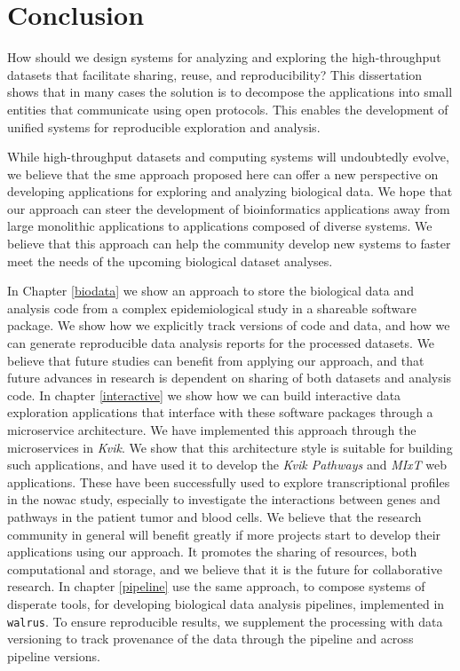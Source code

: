 \chapter{Conclusion}
How should we design systems for analyzing and exploring the high-throughput
datasets that facilitate sharing, reuse, and reproducibility? This dissertation
shows that in many cases the solution is to decompose the applications into
small entities that communicate using open protocols. This enables the
development of unified systems for reproducible exploration and analysis. 

While high-throughput datasets and computing systems will undoubtedly evolve, we
believe that the \gls{sme} approach proposed here can offer a new perspective on
developing applications for exploring and analyzing biological data. We hope
that our approach can steer the development of bioinformatics applications away
from large monolithic applications to applications composed of diverse systems.
We believe that this approach can help the community develop new systems to
faster meet the needs of the upcoming biological dataset analyses. 

In Chapter \ref{biodata} we show an approach to store the biological data and
analysis code from a complex epidemiological study in a shareable software
package. We show how we explicitly track versions of code and data, and how we
can generate reproducible data analysis reports for the processed datasets.
We believe that future studies can benefit from applying our approach, and that
future advances in research is dependent on sharing of both datasets and
analysis code. 
In chapter \ref{interactive} we show how we can build
interactive data exploration applications that interface with these software
packages through a microservice architecture. We have implemented this approach
through the microservices in \emph{Kvik}. We show that this architecture style
is suitable for building such applications, and have used it to develop the
\emph{Kvik Pathways} and \emph{MIxT} web applications. These have been
successfully used to explore transcriptional profiles in the \gls{nowac} study,
especially to investigate the interactions between genes and pathways in the
patient tumor and blood cells. 
We believe that the research community in general will benefit greatly if more
projects start to develop their applications using our approach. It promotes
the sharing of resources, both computational and storage, and we believe that it
is the future for collaborative research. 
In chapter \ref{pipeline} use the same approach, to compose systems of disperate
tools, for developing biological data
analysis pipelines, implemented in \texttt{walrus}.
To ensure reproducible results, we supplement the processing
with data versioning to track provenance of the data through the pipeline and
across pipeline versions. 

